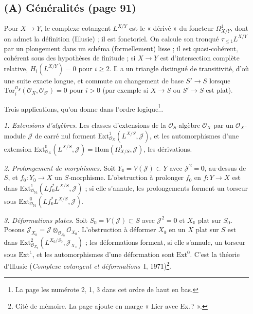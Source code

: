 \documentclass[11pt,a4paper]{article}
\begin{document}
\subsection*{(A) Généralités (page 91)}

Pour $X \to Y$, le complexe cotangent $L^{X/Y}$ est le « dérivé » du
foncteur $\Omega^{1}_{X/Y}$, dont on admet la définition (Illusie) ; il
est fonctoriel. On calcule son tronqué $\tau_{\leq 1} L^{X/Y}$ par un
plongement dans un schéma (formellement) lisse ; il est quasi-cohérent,
cohérent sous des hypothèses de finitude ; si $X \to Y$ est d'intersection
complète relative, $H_i(L^{X/Y}) = 0$ pour $i \geq 2$. Il a un triangle
distingué de transitivité, d'où une suite exacte longue, et commute au
changement de base $S' \to S$ lorsque
$\mathrm{Tor}_i^{\mathcal{O}_S}(\mathcal{O}_X, \mathcal{O}_{S'}) = 0$
pour $i > 0$ (par exemple si $X \to S$ ou $S' \to S$ est plat).

Trois applications, qu'on donne dans l'ordre logique\footnote{La page
les numérote 2, 1, 3 dans cet ordre de haut en bas.}.

\emph{1. Extensions d'algèbres.} Les classes d'extensions de la
$\mathcal{O}_S$-algèbre $\mathcal{O}_X$ par un $\mathcal{O}_X$-module
$\mathcal{J}$ de carré nul forment $\mathrm{Ext}^{1}_{\mathcal{O}_X}(L^{X/S},
\mathcal{J})$, et les automorphismes d'une extension
$\mathrm{Ext}^{0}_{\mathcal{O}_X}(L^{X/S}, \mathcal{J}) =
\mathrm{Hom}(\Omega^{1}_{X/S}, \mathcal{J})$, les dérivations.

\emph{2. Prolongement de morphismes.} Soit $Y_0 = V(\mathcal{J}) \subset
Y$ avec $\mathcal{J}^{2} = 0$, au-dessus de $S$, et $f_0 \colon Y_0 \to
X$ un $S$-morphisme. L'obstruction à prolonger $f_0$ en $f \colon Y \to X$
est dans $\mathrm{Ext}^{1}_{\mathcal{O}_{Y_0}}(Lf_0^{*} L^{X/S},
\mathcal{J})$ ; si elle s'annule, les prolongements forment un torseur
sous $\mathrm{Ext}^{0}_{\mathcal{O}_{Y_0}}(Lf_0^{*} L^{X/S},
\mathcal{J})$.

\emph{3. Déformations plates.} Soit $S_0 = V(\mathcal{J}) \subset S$ avec
$\mathcal{J}^{2} = 0$ et $X_0$ plat sur $S_0$. Posons
$\mathcal{J}_{X_0} = \mathcal{J} \otimes_{\mathcal{O}_{S_0}}
\mathcal{O}_{X_0}$. L'obstruction à déformer $X_0$ en un $X$ plat sur $S$
est dans $\mathrm{Ext}^{2}_{\mathcal{O}_{X_0}}(L^{X_0/S_0},
\mathcal{J}_{X_0})$ ; les déformations forment, si elle s'annule, un
torseur sous $\mathrm{Ext}^{1}$, et les automorphismes d'une déformation
sont $\mathrm{Ext}^{0}$. C'est la théorie d'Illusie (\emph{Complexe
cotangent et déformations}~I, 1971)\footnote{Cité de mémoire. La page
ajoute en marge « Lier avec Ex.\,? ».}.
\end{document}
